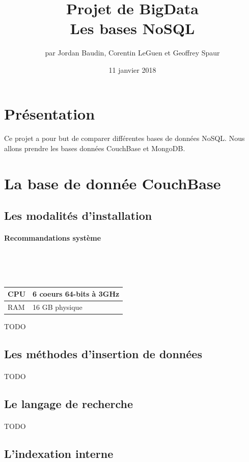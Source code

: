 \documentclass{article}
\title{Projet de BigData \\ Les bases NoSQL}
\author{par Jordan Baudin, Corentin LeGuen et Geoffrey Spaur}
\date{11 janvier 2018}
\begin{document}
\maketitle
\newpage
\tableofcontents{}
\newpage
\section{Présentation}
  \paragraph{}
  Ce projet a pour but de comparer différentes bases de données NoSQL.
  Nous allons prendre les bases données CouchBase et MongoDB.
  
 \newpage
\section{La base de donnée CouchBase}
\subsection{Les modalités d’installation}
  \paragraph{Recommandations système} \

  \
  
    \begin{tabular}{|l|l|}
      \hline
      CPU & 6 coeurs 64-bits à 3GHz \\ \hline
      RAM & 16 GB physique          \\ \hline
    \end{tabular}
    TODO
\subsection{Les méthodes d’insertion de données}
  \paragraph{} TODO
\subsection{Le langage de recherche}
  \paragraph{} TODO
\subsection{L’indexation interne}
\end{document}
